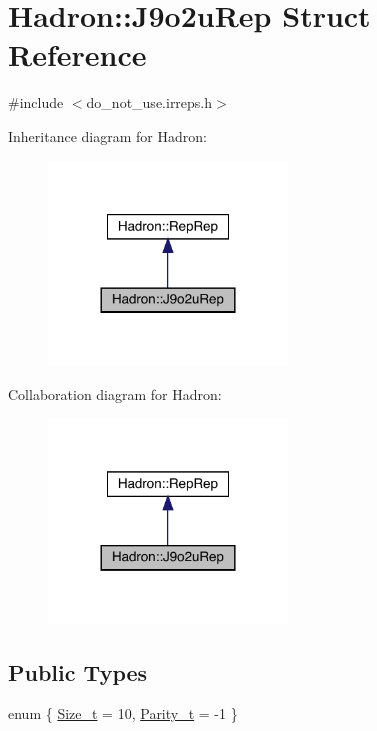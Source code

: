 \hypertarget{structHadron_1_1J9o2uRep}{}\section{Hadron\+:\+:J9o2u\+Rep Struct Reference}
\label{structHadron_1_1J9o2uRep}


{\ttfamily \#include $<$do\+\_\+not\+\_\+use.\+irreps.\+h$>$}



Inheritance diagram for Hadron\+:\nopagebreak
\begin{figure}[H]
\begin{center}
\leavevmode
\includegraphics[width=180pt]{d5/dc4/structHadron_1_1J9o2uRep__inherit__graph}
\end{center}
\end{figure}


Collaboration diagram for Hadron\+:\nopagebreak
\begin{figure}[H]
\begin{center}
\leavevmode
\includegraphics[width=180pt]{d0/d69/structHadron_1_1J9o2uRep__coll__graph}
\end{center}
\end{figure}
\subsection*{Public Types}
\begin{DoxyCompactItemize}
\item 
enum \{ \mbox{\hyperlink{structHadron_1_1J9o2uRep_a6443a31e96ff6dca73279d2f72d83bdda16243257d588c071a04977b2a04d30b8}{Size\+\_\+t}} = 10, 
\mbox{\hyperlink{structHadron_1_1J9o2uRep_a6443a31e96ff6dca73279d2f72d83bdda63f07b39db531cd1f73e93b05529d9fc}{Parity\+\_\+t}} = -\/1
 \}
\end{DoxyCompactItemize}

